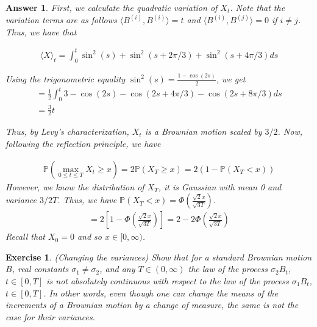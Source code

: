 \documentclass[12pt]{article}
\theoremstyle{colon}
\newtheorem{exercise}{Exercise}
\newtheorem*{answer}{Answer}
\begin{document}
\begin{answer}
  First, we calculate the quadratic variation of $X_t$. Note that the variation terms are as follows $\langle B^{(i)}, B^{(i)} \rangle = t$ and $\langle B^{(i)}, B^{(j)} \rangle = 0$ if $i \neq j$. Thus, we have that

  \begin{gather*}
    \langle X \rangle_t = \int_0^t \sin^2 (s) + \sin^2 (s + 2\pi/3) + \sin^2 (s + 4\pi/3) ds
  \end{gather*}

  Using the trigonometric equality $\sin^2 (s) = \frac{1 - \cos (2s)}{2}$, we get
  \begin{gather*}
    = \frac{1}{2} \int_0^t 3 - \cos (2s) - \cos (2s + 4\pi/3) - \cos (2s + 8\pi/3) ds \\
    = \frac{3}{2} t
  \end{gather*}

  Thus, by Levy's characterization, $X_t$ is a Brownian motion scaled by $3/2$. Now, following the reflection principle, we have

  \begin{gather*}
    \mathbb{P}(\max_{0 \leq t \leq T} X_t \geq x) = 2 \mathbb{P}( X_T \geq x) = 2 (1 - \mathbb{P}( X_T < x))
  \end{gather*}
  However, we know the distribution of $X_T$, it is Gaussian with mean 0 and variance $3/2 T$. Thus, we have $\mathbb{P}( X_T < x) = \Phi(\frac{\sqrt{2}x}{\sqrt{3T}})$.
  \begin{gather*}
    = 2 \left[1 - \Phi \left( \frac{\sqrt{2}x}{\sqrt{3T}} \right) \right] = 2 - 2\Phi \left( \frac{\sqrt{2}x}{\sqrt{3T}} \right)
  \end{gather*}
  Recall that $X_0 = 0$ and so $x \in [0, \infty)$.
\end{answer}

\clearpage

\begin{exercise}
  (Changing the variances) Show that for a standard Brownian motion $B$, real constants $\sigma_1 \neq \sigma_2$, and any $T \in (0, \infty)$ the law of the process $\sigma_2 B_t$, $t \in [0,T]$ is not absolutely continuous with respect to the law of the process $\sigma_1 B_t$, $t \in [0,T]$. In other words, even though one can change the means of the increments of a Brownian motion by a change of measure, the same is not the case for their variances.
\end{exercise}
\end{document}
